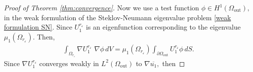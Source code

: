 \documentclass[12pt,reqno]{amsart}
\numberwithin{equation}{section}
\numberwithin{theorem}{section}
\numberwithin{equation}{section}
\numberwithin{theorem}{section}
\begin{document}
\begin{proof}[Proof of Theorem \ref{thm:convergence}]
Now we use a test function $ \phi\in H^1(\Omega_{\mathrm{out}}),$ in the weak formulation of the Steklov-Neumann eigenvalue problem \eqref{weak formulation SN}. 
 Since $U_1^{r_\varepsilon}$ is an eigenfunction corresponding to the eigenvalue $\mu_1(\Omega_{r_\varepsilon}).$ Then,
 \begin{align}\label{passing limit}
     \int_{\Omega_{r_\varepsilon}} \nabla U_1^{r_\varepsilon}\,\, \nabla\phi \, dV= \mu_1(\Omega_{r_\varepsilon}) \int_{\partial \Omega_{\mathrm{out}}} U_1^{r_\varepsilon} \phi \, dS.
 \end{align}
Since $\nabla U_1^{r_\varepsilon}$ converges weakly in $L^2(\Omega_{\mathrm{out}})$  to $\nabla \overline{u_1},$ then


\end{proof}
\end{document}
